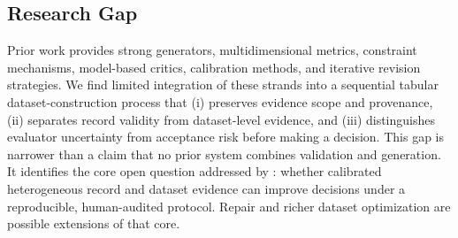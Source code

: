 \subsection{Research Gap}

Prior work provides strong generators, multidimensional metrics, constraint
mechanisms, model-based critics, calibration methods, and iterative revision
strategies. We find limited integration of these strands into a sequential
tabular dataset-construction process that (i) preserves evidence scope and
provenance, (ii) separates record validity from dataset-level evidence, and
(iii) distinguishes evaluator uncertainty from acceptance risk before making
a decision. This gap is narrower than a claim that no prior system combines
validation and generation. It identifies the core open question addressed by
\rcqasyn{}: whether calibrated heterogeneous record and dataset evidence can
improve decisions under a reproducible, human-audited protocol. Repair and
richer dataset optimization are possible extensions of that core.
